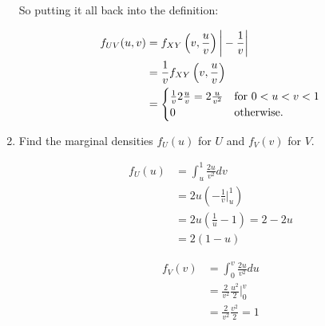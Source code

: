 \documentclass{article}
\newcommand{\1}{\mathbf{1}}
\begin{document}
\begin{enumerate}
    So putting it all back into the definition:
    
    \begin{align*}
     f_{UV}(u,v) &= f_{XY}\left(v, \frac{u}{v}\right) \bigg|- \frac{1}{v}\bigg| \\
     &= \frac{1}{v} f_{XY}\left(v, \frac{u}{v}\right) \\
     &= \begin{cases}
        \frac{1}{v} 2\frac{u}{v} = 2\frac{u}{v^2} & \hbox{for } 0 < u < v < 1\\ 
        0 & \hbox{otherwise.}
        \end{cases}
    \end{align*}
    
    \item Find the marginal densities $f_U(u)$ for $U$ and  $f_V(v)$ for $V$.
    
    \begin{align*}
    f_{U}(u) &= \int_u^1 \frac{2u}{v^2} dv \\
    &= 2u \left(-\frac{1}{v}\bigg|_u^1\right) \\
    &= 2u(\frac{1}{u} - 1) = 2 - 2u \\
    &= 2(1-u)
    \end{align*}
     
    \begin{align*}
    f_{V}(v) &= \int_0^v \frac{2u}{v^2} du \\
    &= \frac{2}{v^2} \frac{u^2}{2}\bigg|_0^v \\
    &= \frac{2}{v^2} \frac{v^2}{2} = 1
    \end{align*}
     
\end{enumerate}
\end{document}
